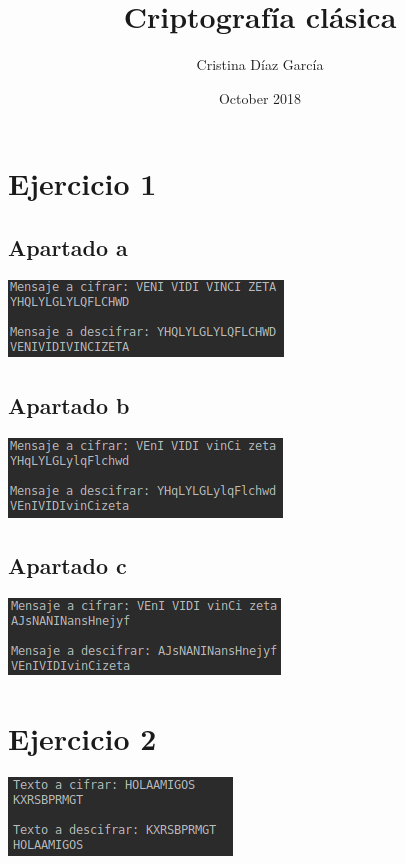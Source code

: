 \documentclass{article}
\title{Criptografía clásica}
\author{Cristina Díaz García}
\date{October 2018}
\begin{document}

\begin{titlingpage}
\maketitle
\end{titlingpage}

\newpage

\tableofcontents

\newpage

\section{Ejercicio 1}
\subsection{Apartado a}
\includegraphics[scale=0.7]{1a.png} 

\subsection{Apartado b}
\includegraphics[scale=0.7]{1b.png}

\subsection{Apartado c}
\includegraphics[scale=0.7]{1c.png}

\newpage

\section{Ejercicio 2}
\includegraphics[scale=0.7]{2.png}
\end{document}
